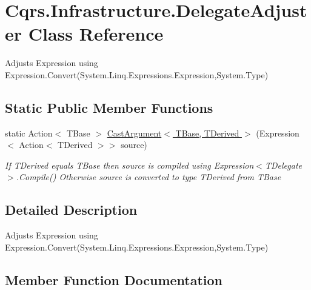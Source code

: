 \hypertarget{classCqrs_1_1Infrastructure_1_1DelegateAdjuster}{}\section{Cqrs.\+Infrastructure.\+Delegate\+Adjuster Class Reference}
\label{classCqrs_1_1Infrastructure_1_1DelegateAdjuster}


Adjusts Expression using Expression.\+Convert(\+System.\+Linq.\+Expressions.\+Expression,\+System.\+Type)  


\subsection*{Static Public Member Functions}
\begin{DoxyCompactItemize}
\item 
static Action$<$ T\+Base $>$ \hyperlink{classCqrs_1_1Infrastructure_1_1DelegateAdjuster_a453c2b48b035fff6b3843e27a5cb960f_a453c2b48b035fff6b3843e27a5cb960f}{Cast\+Argument$<$ T\+Base, T\+Derived $>$} (Expression$<$ Action$<$ T\+Derived $>$$>$ source)
\begin{DoxyCompactList}\small\item\em If {\itshape T\+Derived}  equals {\itshape T\+Base}  then {\itshape source}  is compiled using Expression$<$\+T\+Delegate$>$.\+Compile() Otherwise {\itshape source}  is converted to type {\itshape T\+Derived}  from {\itshape T\+Base}  \end{DoxyCompactList}\end{DoxyCompactItemize}


\subsection{Detailed Description}
Adjusts Expression using Expression.\+Convert(\+System.\+Linq.\+Expressions.\+Expression,\+System.\+Type) 



\subsection{Member Function Documentation}
\mbox{\label{classCqrs_1_1Infrastructure_1_1DelegateAdjuster_a453c2b48b035fff6b3843e27a5cb960f_a453c2b48b035fff6b3843e27a5cb960f}} 
